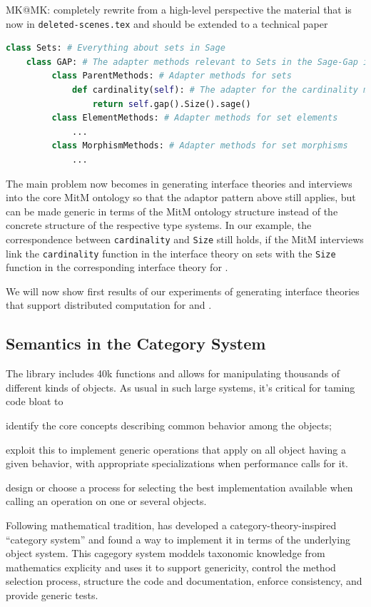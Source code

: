 \begin{newpart}{MK@MK: completely rewrite from a high-level perspective the material that
    is now in \texttt{deleted-scenes.tex} and should be extended to a technical paper}
\begin{lstlisting}[language=Python,label=lst:adaptor,
  caption=A Semantic Adaptor Mehthod in \Sage]
class Sets: # Everything about sets in Sage
    class GAP: # The adapter methods relevant to Sets in the Sage-Gap interface
         class ParentMethods: # Adapter methods for sets
             def cardinality(self): # The adapter for the cardinality method
                 return self.gap().Size().sage()
         class ElementMethods: # Adapter methods for set elements
             ...
         class MorphismMethods: # Adapter methods for set morphisms
             ...
\end{lstlisting}
The main problem now becomes in generating interface theories and interviews into the core
MitM ontology so that the adaptor pattern above still applies, but can be made generic in
terms of the MitM ontology structure instead of the concrete structure of the respective
type systems. In our example, the correspondence between \texttt{cardinality} and
\texttt{Size} still holds, if the MitM interviews link the \texttt{cardinality} function
in the \Sage interface theory on sets with the \texttt{Size} function in the corresponding
interface theory for \GAP.

We will now show first results of our experiments of generating interface theories that
support distributed computation for \Sage and \GAP. 
\end{newpart}

\subsection{Semantics in the \Sage Category System}

The \Sage library includes 40k functions and allows for manipulating thousands of
different kinds of objects. As usual in such large systems, it’s critical for taming code
bloat to
\begin{inparaenum}[\em i\rm)]
\item identify the core concepts describing common behavior among the objects; 
\item exploit this to implement generic operations that apply on all object having a given
  behavior, with appropriate specializations when performance calls for it.  
\item design or choose a process for selecting the best implementation available when
  calling an operation on one or several objects.
\end{inparaenum}
Following mathematical tradition, \Sage has developed a category-theory-inspired
``category system'' and found a way to implement it in terms of the underlying \Python
object system. This cagegory system moddels
taxonomic knowledge from mathematics explicity and uses it to support genericity, control
the method selection process, structure the code and documentation, enforce consistency,
and provide generic tests.

